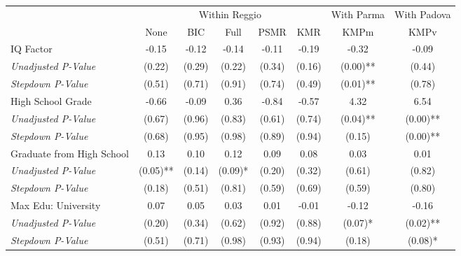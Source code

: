 \begin{tabular}{l c c c c c c c}
\toprule
& \multicolumn{5}{c}{Within Reggio} & With Parma & With Padova \\\cmidrule(lr){2-6} \cmidrule(lr){7-7} \cmidrule(lr){8-8}
 & None & BIC & Full & PSMR & KMR & KMPm & KMPv \\
\midrule
IQ Factor & -0.15 & -0.12 & -0.14 & -0.11 & -0.19 & -0.32 & -0.09 \\
\quad \textit{Unadjusted P-Value} & (0.22) & (0.29) & (0.22) & (0.34) & (0.16) & (0.00)** & (0.44) \\
\quad \textit{Stepdown P-Value} & (0.51) & (0.71) & (0.91) & (0.74) & (0.49) & (0.01)** & (0.78) \\
High School Grade & -0.66 & -0.09 & 0.36 & -0.84 & -0.57 & 4.32 & 6.54 \\
\quad \textit{Unadjusted P-Value} & (0.67) & (0.96) & (0.83) & (0.61) & (0.74) & (0.04)** & (0.00)** \\
\quad \textit{Stepdown P-Value} & (0.68) & (0.95) & (0.98) & (0.89) & (0.94) & (0.15) & (0.00)** \\
Graduate from High School & 0.13 & 0.10 & 0.12 & 0.09 & 0.08 & 0.03 & 0.01 \\
\quad \textit{Unadjusted P-Value} & (0.05)** & (0.14) & (0.09)* & (0.20) & (0.32) & (0.61) & (0.82) \\
\quad \textit{Stepdown P-Value} & (0.18) & (0.51) & (0.81) & (0.59) & (0.69) & (0.59) & (0.80) \\
Max Edu: University & 0.07 & 0.05 & 0.03 & 0.01 & -0.01 & -0.12 & -0.16 \\
\quad \textit{Unadjusted P-Value} & (0.20) & (0.34) & (0.62) & (0.92) & (0.88) & (0.07)* & (0.02)** \\
\quad \textit{Stepdown P-Value} & (0.51) & (0.71) & (0.98) & (0.93) & (0.94) & (0.18) & (0.08)* \\
\bottomrule
\end{tabular}

